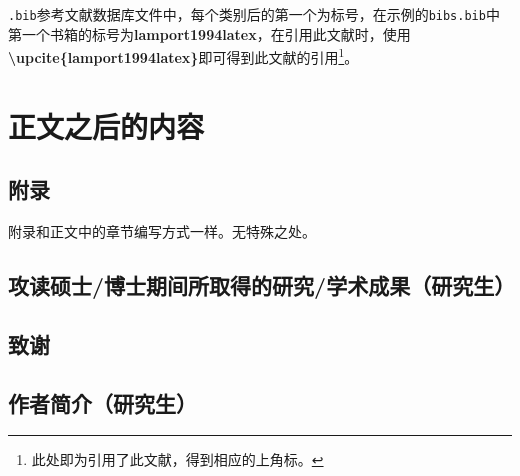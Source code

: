 \texttt{.bib}参考文献数据库文件中，每个类别后的第一个为标号，在示例的\texttt{bibs.bib}中第一个书箱的标号为\textbf{lamport1994latex}，在引用此文献时，使用\textbf{\textbackslash upcite\{lamport1994latex\}}即可得到此文献的引用\footnote{此处即为引用了此文献，得到相应的上角标。}。

\section{正文之后的内容}
\subsection{附录}
附录和正文中的章节编写方式一样。无特殊之处。
\subsection{攻读硕士\slash 博士期间所取得的研究\slash 学术成果（研究生）}
\subsection{致谢}
\subsection{作者简介（研究生）}
